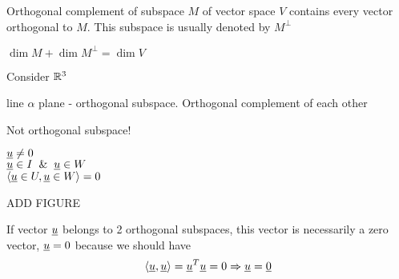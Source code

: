 \begin{definition}
Orthogonal complement of subspace $M$ of vector space $V$ contains every vector orthogonal to $M$. This subspace is usually denoted by $M^\perp$
\end{definition}

\begin{remark}
$\dim M+\dim M^\perp = \dim V$	
\end{remark}
\begin{example}
Consider $\mathbb{R}^3$
\begin{center}
\end{center}
line $\alpha$ plane	- orthogonal subspace. Orthogonal complement of each other
\end{example}
\begin{example}
Not orthogonal subspace!\\
\begin{minipage}[t]{0.45\linewidth}
$\underline{u}\not=0$\\
$\underline{u}\in I \hspace{2mm}\& \hspace{2mm}\underline{u}\in W$\\
$\langle \underline{u}\in U,\underline{u}\in W\rangle=0$
\end{minipage}
\begin{minipage}[t]{0.45\linewidth}
ADD FIGURE	
\end{minipage}
\end{example}

\begin{note}
If vector $\underline{u}$ belongs to 2 orthogonal subspaces, this vector is necessarily a zero vector, $\underline{u} = 0$ because we should have 
\[
\langle\underline{u},\underline{u}\rangle = \underline{u}^T\underline{u} = 0\Rightarrow \underline{u} = \underline{0}
\]
\end{note}

























